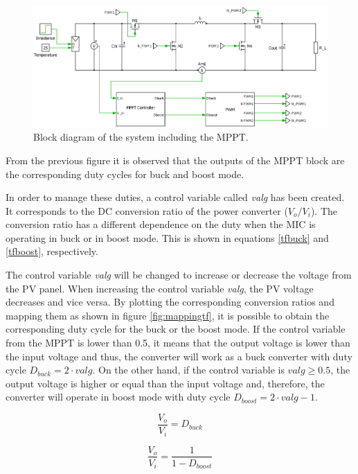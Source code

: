 \begin{figure}[H]
	\begin{center}
		\includegraphics[width=1\textwidth]{../Pictures/BD_implementation_POalgorithm}
		\caption{Block diagram of the system including the MPPT.}
		\label{BD_POalgorithm}
	\end{center}	
\end{figure}

From the previous figure it is observed that the outputs of the MPPT block are the corresponding duty cycles for buck and boost mode. 

In order to manage these duties, a control variable called \textit{valg} has been created. It corresponds to the DC conversion ratio of the power converter ($V_{o}/V_{i}$). The conversion ratio has a different dependence on the duty when the MIC is operating in buck or in boost mode. This is shown in equations \ref{tfbuck} and \ref{tfboost}, respectively. 

The control variable \textit{valg} will be changed to increase or decrease the voltage from the PV panel. When increasing the control variable \textit{valg}, the PV voltage decreases and vice versa.
By plotting the corresponding conversion ratios and mapping them as shown in figure \ref{fig:mappingtf}, it is possible to obtain the corresponding duty cycle for the buck or the boost mode. If the control variable from the MPPT is lower than 0.5, it  means that the output voltage is lower than the input voltage and thus, the converter will work as a buck converter with duty cycle $D_{buck}=2 \cdot valg$. On the other hand, if the control variable is $valg \geq 0.5$, the output voltage is higher or equal than the input voltage and, therefore, the converter will operate in boost mode with duty cycle $D_{boost}=2\cdot valg - 1$. %

\vspace{1cm}
\begin{minipage}{0.3\linewidth}
	\begin{equation}	\label{tfbuck}
	\frac{V_o}{V_i} = D_{buck}
	\end{equation}

\end{minipage}%
\begin{minipage}{0.5\linewidth}	
	\begin{equation}	\label{tfboost}
	\frac{V_o}{V_i}= \frac{1}{1-D_{boost}}
	\end{equation}

\end{minipage}

